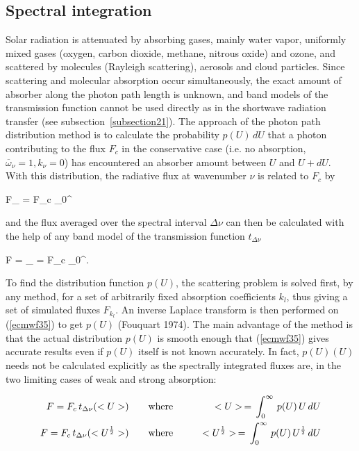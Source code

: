 %
\subsection{Spectral integration}
%

Solar radiation is attenuated by absorbing gases, mainly water vapor,
uniformly mixed gases (oxygen, carbon dioxide, methane, nitrous oxide) and
ozone, and scattered by molecules (Rayleigh scattering), aerosols and cloud 
particles. Since scattering and molecular absorption occur simultaneously, the
exact amount of absorber along the photon path length is unknown, and band
models of the transmission function cannot be used directly as in the shortwave
radiation transfer (see subsection~\ref{subsection21}). The approach of the photon path
distribution method is to calculate the probability $p(U) \, dU$ that a photon
contributing to the flux $F_c$ in the conservative case (i.e. no
absorption, $\overline{\omega}_{\nu} = 1, k_{\nu} = 0$) has encountered an
absorber amount between $U$ and $U + dU$. With this distribution, the radiative flux at wavenumber $\nu $ is related to $F_c$ by

\medskip
\be
F_{\nu} = F_c \int_0^{\infty}
\label{ecmwf35}
\ee
\medskip

\noindent and the flux averaged over the spectral interval $\Delta\nu$ can then be calculated with the help of any band model of the transmission function $t_{\Delta\nu}$

\medskip
\be
F =  \int_{\Delta\nu} = F_c \int_0^{\infty}.
\label{ecmwf36}
\ee
\medskip

To find the distribution function $p(U)$, the scattering problem is solved first, by any method, for a set of arbitrarily fixed absorption coefficients $k_l$, thus giving a set of simulated fluxes $F_{k_l}$. An inverse Laplace transform is then performed on (\ref{ecmwf35}) to get $p(U)$ (Fouquart 1974). The main advantage of the method is that the actual distribution $p(U)$ is smooth enough that (\ref{ecmwf35}) gives accurate results even if $p(U)$ itself is not known accurately. In fact, $p(U)(U)$ needs not be calculated explicitly as the spectrally integrated fluxes are, in the two limiting cases of weak and strong absorption:

\medskip
\begin{eqnarray}\label{ecmwf37}
F = F_c \, t_{\Delta\nu}(<U>)   \qquad &{\rm where}& \qquad <U> \, = \, \int_0^{\infty} \, p(U) \, U \, dU \cr
F = F_c \, t_{\Delta\nu}(<U^{\frac{1}{2}}>) \qquad &{\rm where}& \qquad <U^{\frac{1}{2}}> \, = \, \int_0^{\infty} \, p(U) \, U^{\frac{1}{2}} \, dU
\end{eqnarray}
\medskip

